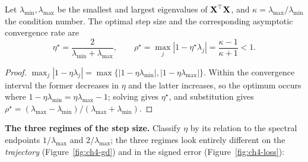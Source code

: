 \begin{corollary}\label{thm:gd-opt}
Let $\lambda_{\min}, \lambda_{\max}$ be the smallest and largest eigenvalues of $\mathbf{X}^\top\mathbf{X}$, and $\kappa = \lambda_{\max}/\lambda_{\min}$ the condition number. The optimal step size and the corresponding asymptotic convergence rate are
\begin{equation}\label{eq:gd-opt}
  \eta^\star = \frac{2}{\lambda_{\min} + \lambda_{\max}},
  \qquad
  \rho^\star = \max_j |1 - \eta^\star \lambda_j| = \frac{\kappa - 1}{\kappa + 1} < 1 .
\end{equation}
\end{corollary}
\begin{proof}
$\max_j |1 - \eta\lambda_j| = \max\{|1 - \eta\lambda_{\min}|, |1 - \eta\lambda_{\max}|\}$. Within the convergence interval the former decreases in $\eta$ and the latter increases, so the optimum occurs where $1 - \eta\lambda_{\min} = \eta\lambda_{\max} - 1$; solving gives $\eta^\star$, and substitution gives $\rho^\star = (\lambda_{\max} - \lambda_{\min})/(\lambda_{\max} + \lambda_{\min})$.
\end{proof}

\textbf{The three regimes of the step size.} Classify $\eta$ by its relation to the spectral endpoints $1/\lambda_{\max}$ and $2/\lambda_{\max}$; the three regimes look entirely different on the \emph{trajectory} (Figure~\ref{fig:ch4-gd}) and in the signed error (Figure~\ref{fig:ch4-loss}):

